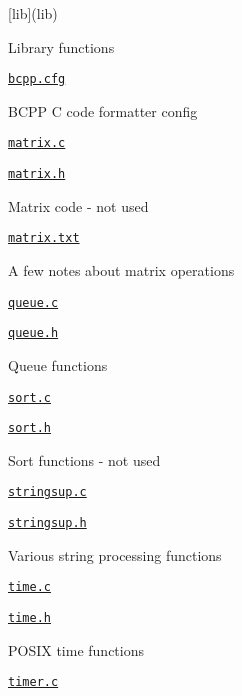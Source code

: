 \begin{DoxyItemize}
\item \mbox{[}lib\mbox{]}(lib)
\begin{DoxyItemize}
\item Library functions
\item \href{lib/bcpp.cfg}{\tt bcpp.\+cfg}
\begin{DoxyItemize}
\item B\+C\+PP C code formatter config
\end{DoxyItemize}
\item \href{lib/matrix.c}{\tt matrix.\+c}
\item \href{lib/matrix.h}{\tt matrix.\+h}
\begin{DoxyItemize}
\item Matrix code -\/ not used
\end{DoxyItemize}
\item \href{lib/matrix.txt}{\tt matrix.\+txt}
\begin{DoxyItemize}
\item A few notes about matrix operations
\end{DoxyItemize}
\item \href{lib/queue.c}{\tt queue.\+c}
\item \href{lib/queue.h}{\tt queue.\+h}
\begin{DoxyItemize}
\item Queue functions
\end{DoxyItemize}
\item \href{lib/sort.c}{\tt sort.\+c}
\item \href{lib/sort.h}{\tt sort.\+h}
\begin{DoxyItemize}
\item Sort functions -\/ not used
\end{DoxyItemize}
\item \href{lib/stringsup.c}{\tt stringsup.\+c}
\item \href{lib/stringsup.h}{\tt stringsup.\+h}
\begin{DoxyItemize}
\item Various string processing functions
\end{DoxyItemize}
\item \href{lib/time.c}{\tt time.\+c}
\item \href{lib/time.h}{\tt time.\+h}
\begin{DoxyItemize}
\item P\+O\+S\+IX time functions
\end{DoxyItemize}
\item \href{lib/timer.c}{\tt timer.\+c}

\end{DoxyItemize}
\end{DoxyItemize}
